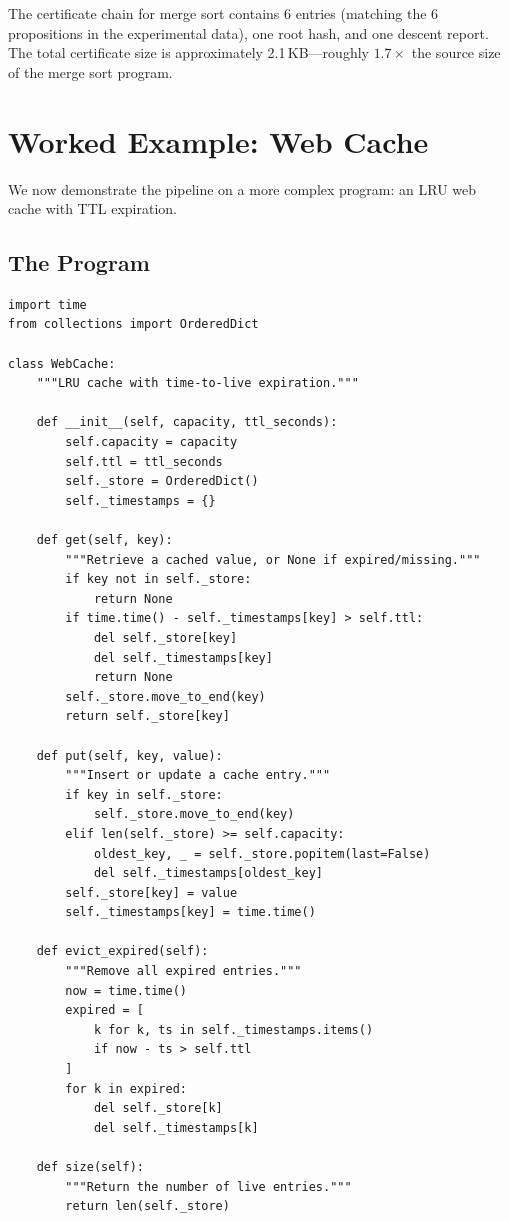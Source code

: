 \documentclass[11pt]{article}
\begin{document}
\begin{remark}
The certificate chain for merge sort contains 6 entries (matching
the 6 propositions in the experimental data), one root hash, and
one descent report.  The total certificate size is approximately
2.1\,KB---roughly $1.7\times$ the source size of the merge sort
program.
\end{remark}

\section{Worked Example: Web Cache}\label{sec:web-cache}

We now demonstrate the pipeline on a more complex program: an
LRU web cache with TTL expiration.

\subsection{The Program}

\begin{lstlisting}[style=jugeo-python,caption={LRU web cache with TTL expiration.}]
import time
from collections import OrderedDict

class WebCache:
    """LRU cache with time-to-live expiration."""

    def __init__(self, capacity, ttl_seconds):
        self.capacity = capacity
        self.ttl = ttl_seconds
        self._store = OrderedDict()
        self._timestamps = {}

    def get(self, key):
        """Retrieve a cached value, or None if expired/missing."""
        if key not in self._store:
            return None
        if time.time() - self._timestamps[key] > self.ttl:
            del self._store[key]
            del self._timestamps[key]
            return None
        self._store.move_to_end(key)
        return self._store[key]

    def put(self, key, value):
        """Insert or update a cache entry."""
        if key in self._store:
            self._store.move_to_end(key)
        elif len(self._store) >= self.capacity:
            oldest_key, _ = self._store.popitem(last=False)
            del self._timestamps[oldest_key]
        self._store[key] = value
        self._timestamps[key] = time.time()

    def evict_expired(self):
        """Remove all expired entries."""
        now = time.time()
        expired = [
            k for k, ts in self._timestamps.items()
            if now - ts > self.ttl
        ]
        for k in expired:
            del self._store[k]
            del self._timestamps[k]

    def size(self):
        """Return the number of live entries."""
        return len(self._store)
\end{lstlisting}
\end{document}

